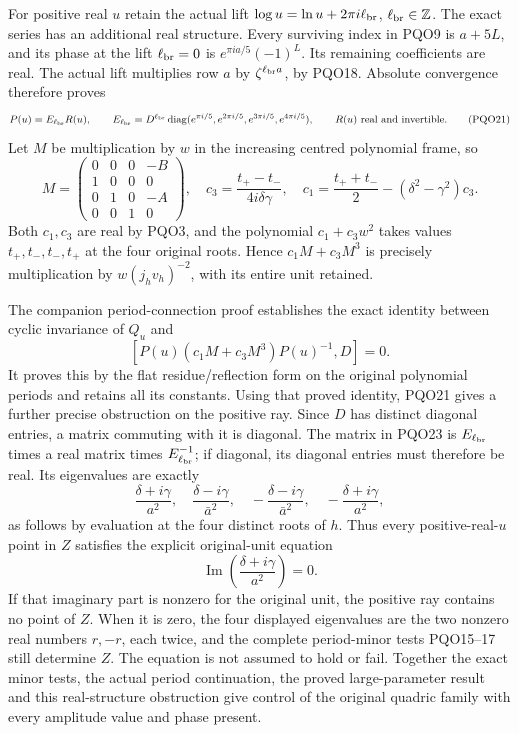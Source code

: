 \documentclass[11pt,a4paper]{article}
\begin{document}
For positive real $u$ retain the actual lift
$\log u=\ln u+2\pi i\ell_{\rm br}$, $\ell_{\rm br}\in\mathbb Z$.
The exact series has an additional real structure. Every
surviving index in PQO9 is $a+5L$, and its phase at the lift
$\ell_{\rm br}=0$ is $e^{\pi ia/5}(-1)^L$. Its remaining
coefficients are real. The actual lift multiplies row $a$ by
$\zeta^{\ell_{\rm br}a}$, by PQO18. Absolute convergence
therefore proves
\[
 P(u)=E_{\ell_{\rm br}} R(u),\qquad
 E_{\ell_{\rm br}}=D^{\ell_{\rm br}}
 \operatorname{diag}(e^{\pi i/5},e^{2\pi i/5},
                       e^{3\pi i/5},e^{4\pi i/5}),
 \qquad R(u)\text{ real and invertible}.
 \tag{PQO21}
\]
Let $M$ be multiplication by $w$ in the increasing centred
polynomial frame, so
\[
 M=\begin{pmatrix}0&0&0&-B\\1&0&0&0\\0&1&0&-A\\0&0&1&0\end{pmatrix},
 \quad c_3=\frac{t_+-t_-}{4i\delta\gamma},\quad
 c_1=\frac{t_++t_-}{2}-(\delta^2-\gamma^2)c_3.
 \tag{PQO22}
\]
Both $c_1,c_3$ are real by PQO3, and the polynomial
$c_1+c_3 w^2$ takes values $t_+,t_-,t_-,t_+$ at the four
original roots. Hence $c_1M+c_3M^3$ is precisely multiplication
by $w(j_hv_h)^{-2}$, with its entire unit retained.

The companion period-connection proof establishes the exact
identity between cyclic invariance of $Q_u$ and
\[
 [P(u)(c_1M+c_3M^3)P(u)^{-1},D]=0.
 \tag{PQO23}
\]
It proves this by the flat residue/reflection form on the
original polynomial periods and retains all its constants.
Using that proved identity, PQO21 gives a further precise
obstruction on the positive ray. Since $D$ has distinct
diagonal entries, a matrix commuting with it is diagonal.
The matrix in PQO23 is $E_{\ell_{\rm br}}$ times a real matrix
times $E_{\ell_{\rm br}}^{-1}$;
if diagonal, its diagonal entries must therefore be real.
Its eigenvalues are exactly
\[
 \frac{\delta+i\gamma}{a^2},\quad
 \frac{\delta-i\gamma}{\bar a^2},\quad
 -\frac{\delta-i\gamma}{\bar a^2},\quad
 -\frac{\delta+i\gamma}{a^2},
 \tag{PQO24}
\]
as follows by evaluation at the four distinct roots of $h$.
Thus every positive-real-$u$ point in $Z$ satisfies the explicit
original-unit equation
\[
 \operatorname{Im}\left(\frac{\delta+i\gamma}{a^2}\right)=0.
 \tag{PQO25}
\]
If that imaginary part is nonzero for the original unit, the
positive ray contains no point of $Z$. When it is zero, the
four displayed eigenvalues are the two nonzero real numbers
$r,-r$, each twice, and the complete period-minor tests
PQO15--17 still determine $Z$. The equation is not assumed
to hold or fail. Together the exact minor tests, the actual
period continuation, the proved large-parameter result and
this real-structure obstruction give control of the original
quadric family with every amplitude value and phase present.
\end{document}
